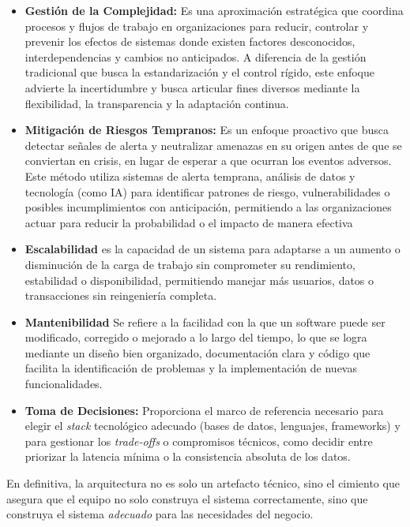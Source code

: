 \begin{itemize}
\item \textbf{Gestión de la Complejidad:} Es una aproximación estratégica que coordina procesos y flujos de trabajo en organizaciones para reducir, controlar y prevenir los efectos de sistemas donde existen factores desconocidos, interdependencias y cambios no anticipados.  A diferencia de la gestión tradicional que busca la estandarización y el control rígido, este enfoque advierte la incertidumbre y busca articular fines diversos mediante la flexibilidad, la transparencia y la adaptación continua.

\item \textbf{Mitigación de Riesgos Tempranos:} Es un enfoque proactivo que busca detectar señales de alerta y neutralizar amenazas en su origen antes de que se conviertan en crisis, en lugar de esperar a que ocurran los eventos adversos.  Este método utiliza sistemas de alerta temprana, análisis de datos y tecnología (como IA) para identificar patrones de riesgo, vulnerabilidades o posibles incumplimientos con anticipación, permitiendo a las organizaciones actuar para reducir la probabilidad o el impacto de manera efectiva

\item \textbf{Escalabilidad} es la capacidad de un sistema para adaptarse a un aumento o disminución de la carga de trabajo sin comprometer su rendimiento, estabilidad o disponibilidad, permitiendo manejar más usuarios, datos o transacciones sin reingeniería completa. 

\item \textbf{Mantenibilidad} Se refiere a la facilidad con la que un software puede ser modificado, corregido o mejorado a lo largo del tiempo, lo que se logra mediante un diseño bien organizado, documentación clara y código que facilita la identificación de problemas y la implementación de nuevas funcionalidades. 

\item \textbf{Toma de Decisiones:} Proporciona el marco de referencia necesario para elegir el \textit{stack} tecnológico adecuado (bases de datos, lenguajes, frameworks) y para gestionar los \textit{trade-offs} o compromisos técnicos, como decidir entre priorizar la latencia mínima o la consistencia absoluta de los datos.

\end{itemize}

En definitiva, la arquitectura no es solo un artefacto técnico, sino el cimiento que asegura que el equipo no solo construya el sistema correctamente, sino que construya el sistema \textit{adecuado} para las necesidades del negocio.

